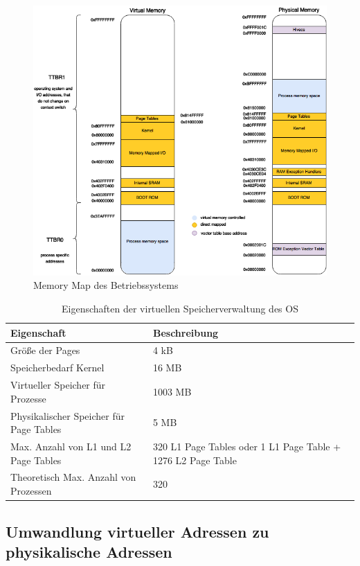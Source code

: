 \begin{figure}[H]
	\includegraphics[scale=0.7]{figures/MemoryMap}
	\caption{Memory Map des Betriebssystems}
	\label{fig:MemoryMap}
\end{figure}

\begin{table}[H]
\begin{tabular}{p{7cm} | p{7cm}}
  \textbf{Eigenschaft} & \textbf{Beschreibung} \\ \hline
  Größe der Pages & 4 kB\\
  Speicherbedarf Kernel & 16 MB\\
  Virtueller Speicher für Prozesse & 1003 MB\\
  Physikalischer Speicher für Page Tables	& 5 MB\\
  Max. Anzahl von L1 und L2 Page Tables & 320 L1 Page Tables oder 1 L1 Page Table + 1276 L2 Page  Table\\
  Theoretisch Max. Anzahl von Prozessen & 320\\
 \end{tabular}
 \caption{Eigenschaften der virtuellen Speicherverwaltung des OS}
 \label{table:SpecifiedVirtualMemory}
\end{table}

\subsection{Umwandlung virtueller Adressen zu physikalische Adressen}

